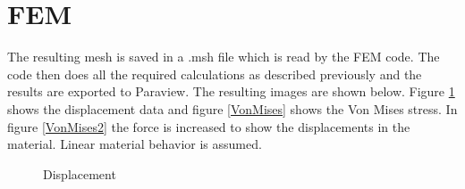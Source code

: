 \section{FEM}
The resulting mesh is saved in a .msh file which is read by the FEM code. The code then does all the required calculations as described previously and the results are exported to Paraview. The resulting images are shown below. Figure \ref{Disp} shows the displacement data and figure \ref{VonMises} shows the Von Mises stress. In figure \ref{VonMises2} the force is increased to show the displacements in the material. Linear material behavior is assumed.

 \begin{figure}[H]
 	\begin{center}
    \caption{Displacement}
    \label{Disp}
	\end{center}
\end{figure}


